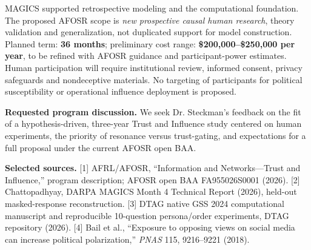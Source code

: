 \documentclass[10pt,letterpaper]{article}
\begin{document}
MAGICS supported retrospective modeling and the computational foundation. The proposed AFOSR scope is \emph{new prospective causal human research}, theory validation and generalization, not duplicated support for model construction. Planned term: \textbf{36 months}; preliminary cost range: \textbf{\$200,000--\$250,000 per year}, to be refined with AFOSR guidance and participant-power estimates. Human participation will require institutional review, informed consent, privacy safeguards and nondeceptive materials. No targeting of participants for political susceptibility or operational influence deployment is proposed.

\vspace{3pt}
\noindent\colorbox{light}{\parbox{\dimexpr\linewidth-2\fboxsep\relax}{\small\textbf{Requested program discussion.} We seek Dr. Steckman's feedback on the fit of a hypothesis-driven, three-year Trust and Influence study centered on human experiments, the priority of resonance versus trust-gating, and expectations for a full proposal under the current AFOSR open BAA.}}

\vspace{5pt}
{\footnotesize\color{graytext}\textbf{Selected sources.} [1] AFRL/AFOSR, ``Information and Networks---Trust and Influence,'' program description; AFOSR open BAA FA955026S0001 (2026). [2] Chattopadhyay, DARPA MAGICS Month 4 Technical Report (2026), held-out masked-response reconstruction. [3] DTAG native GSS 2024 computational manuscript and reproducible 10-question persona/order experiments, DTAG repository (2026). [4] Bail et al., ``Exposure to opposing views on social media can increase political polarization,'' \emph{PNAS} 115, 9216--9221 (2018).}
\end{document}
